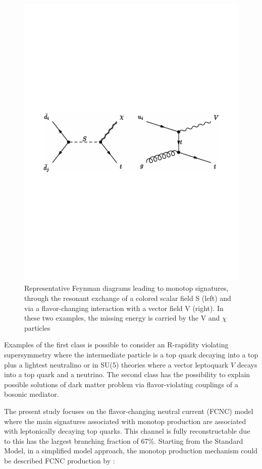 \begin{figure}
\centering
\includegraphics[scale=0.60]{figures/theory_mtop.pdf}
\caption{Representative Feynman diagrams leading to monotop signatures, through the resonant exchange of a colored scalar field S (left) and via a flavor-changing interaction with a vector field V (right). In these two examples, the missing energy is carried by the V and $\chi$ particles}
\end{figure}

Examples of the first class is possible to consider an R-rapidity violating supersymmetry where the intermediate particle is a top quark decaying into a top plus a lightest neutralino or in SU(5) theories where a vector leptoquark $V$ decays into a top quark and a neutrino. The second class has the possibility to explain possible solutions of dark matter problem via flavor-violating couplings of a bosonic mediator.


The present study focuses on the flavor-changing neutral current (FCNC) model where the main signatures associated with monotop production are associated with leptonically decaying top quarks. This channel is fully reconstructable due to this has the largest branching fraction of 67\%. Starting from the Standard Model, in a simplified model approach, the monotop production mechanism could be described FCNC production by \cite{319,320,322}: 

